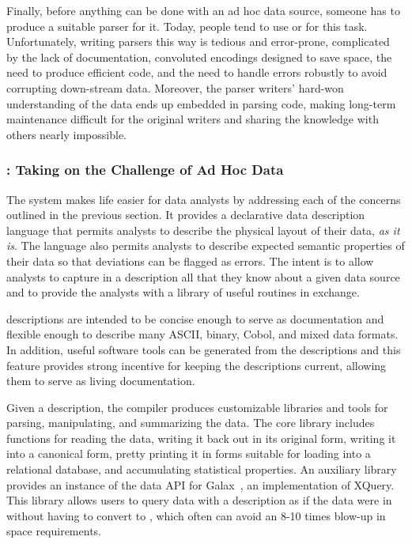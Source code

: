 \documentclass[11pt]{article}
\begin{document}
Finally, before anything can be done with an ad hoc data source,
someone has to produce a suitable parser for it.  Today, people tend
to use \C{} or \perl{} for this task.  Unfortunately, writing parsers
this way is tedious and error-prone, complicated by the lack of
documentation, convoluted encodings designed to save space, the need
to produce efficient code, and the need to handle errors robustly to
avoid corrupting down-stream data.  Moreover, the parser writers'
hard-won understanding of the data ends up embedded in parsing code,
making long-term maintenance difficult for the original writers and
sharing the knowledge with others nearly impossible.

\subsubsection{\pads{}:  Taking on the Challenge of Ad Hoc Data}

The \pads{} system makes life easier for data analysts by addressing
each of the concerns outlined in the previous section.
It provides a declarative data description
language that permits analysts to describe the physical layout of
their data, \textit{as it is}.  The language also permits analysts to
describe expected semantic properties of their data so that deviations can
be flagged as errors. The intent is to allow analysts to capture in a
\pads{} description all that they know about a given data source
and to provide the analysts with a library of useful routines in exchange. 


\pads{} descriptions are intended to be concise enough to serve as
documentation and flexible enough to describe many ASCII, binary,
Cobol, and mixed data formats.  In addition, useful software tools
can be generated from the descriptions and this feature provides
strong incentive for keeping the descriptions current, allowing them
to serve as living documentation.  

Given a \pads{} description, the \pads{} compiler produces
customizable \C{} libraries and tools for parsing, manipulating, and
summarizing the data.  The core \C{} library includes functions for
reading the data, writing it back out in its original form, writing it
into a canonical \xml{} form, pretty printing it in forms suitable for
loading into a relational database, and accumulating statistical
properties.  An auxiliary library provides an instance of the data API
for Galax~\cite{galax,galaxmanual}, an implementation of XQuery.  This
library allows users to query data with a \pads{} description as if
the data were in \xml{} without having to convert to \xml, which often
can avoid an 8-10 times blow-up in space requirements.  
\end{document}
